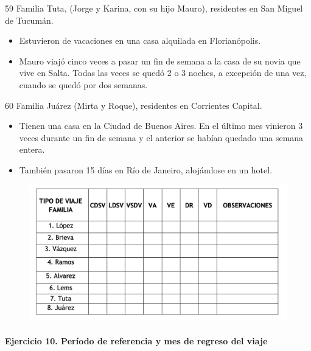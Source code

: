 \documentclass[
  openany]{book}
\begin{document}
59 Familia Tuta, (Jorge y Karina, con su hijo Mauro), residentes en San Miguel de Tucumán.

\begin{itemize}
\item
  Estuvieron de vacaciones en una casa alquilada en Florianópolis.
\item
  Mauro viajó cinco veces a pasar un fin de semana a la casa de su novia que vive en Salta. Todas las veces se quedó 2 o 3 noches, a excepción de una vez, cuando se quedó por dos semanas.
\end{itemize}

60 Familia Juárez (Mirta y Roque), residentes en Corrientes Capital.

\begin{itemize}
\item
  Tienen una casa en la Ciudad de Buenos Aires. En el último mes vinieron 3 veces durante un fin de semana y el anterior se habían quedado una semana entera.
\item
  También pasaron 15 días en Río de Janeiro, alojándose en un hotel.
\end{itemize}

\begin{figure}

{\centering \includegraphics[width=1\linewidth]{imagenes/figura6-148} 

}

\end{figure}

\hypertarget{ejercicio-10.-peruxedodo-de-referencia-y-mes-de-regreso-del-viaje}{%
\paragraph{Ejercicio 10. Período de referencia y mes de regreso del viaje}\label{ejercicio-10.-peruxedodo-de-referencia-y-mes-de-regreso-del-viaje}}
\end{document}
